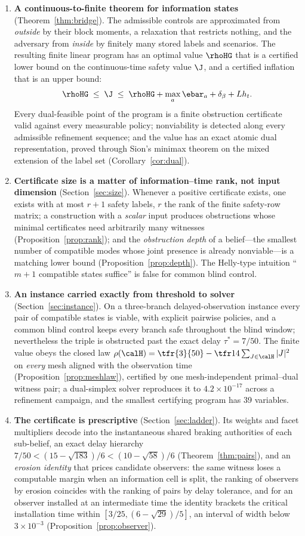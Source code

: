 \begin{enumerate}[leftmargin=1.6em,itemsep=2pt]
\item \textbf{A continuous-to-finite theorem for information states} (Theorem~\ref{thm:bridge}). The admissible controls are approximated from \emph{outside} by their block moments, a relaxation that restricts nothing, and the adversary from \emph{inside} by finitely many stored labels and scenarios. The resulting finite linear program has an optimal value $\rhoHG$ that is a certified lower bound on the continuous-time safety value $\J$, and a certified inflation that is an upper bound:
\[
\rhoHG\;\le\;\J\;\le\;\rhoHG+\max_a\ebar_a+\delta_\beta+Lh_t .
\]
Every dual-feasible point of the program is a finite obstruction certificate valid against every measurable policy; nonviability is detected along every admissible refinement sequence; and the value has an exact atomic dual representation, proved through Sion's minimax theorem on the mixed extension of the label set (Corollary~\ref{cor:dual}).
\item \textbf{Certificate size is a matter of information--time rank, not input dimension} (Section~\ref{sec:size}). Whenever a positive certificate exists, one exists with at most $r+1$ safety labels, $r$ the rank of the finite safety-row matrix; a construction with a \emph{scalar} input produces obstructions whose minimal certificates need arbitrarily many witnesses (Proposition~\ref{prop:rank}); and the \emph{obstruction depth} of a belief---the smallest number of compatible modes whose joint presence is already nonviable---is a matching lower bound (Proposition~\ref{prop:depth}). The Helly-type intuition ``$m+1$ compatible states suffice'' is false for common blind control.
\item \textbf{An instance carried exactly from threshold to solver} (Section~\ref{sec:instance}). On a three-branch delayed-observation instance every pair of compatible states is viable, with explicit pairwise policies, and a common blind control keeps every branch safe throughout the blind window; nevertheless the triple is obstructed past the exact delay $\tau^\ast=7/50$. The finite value obeys the closed law $\rho(\calH)=\tfr{3}{50}-\tfr14\sum_{J\in\calH}|J|^2$ on \emph{every} mesh aligned with the observation time (Proposition~\ref{prop:meshlaw}), certified by one mesh-independent primal--dual witness pair; a dual-simplex solver reproduces it to $4.2\times10^{-17}$ across a refinement campaign, and the smallest certifying program has 39 variables.
\item \textbf{The certificate is prescriptive} (Section~\ref{sec:ladder}). Its weights and facet multipliers decode into the instantaneous shared braking authorities of each sub-belief, an exact delay hierarchy $7/50<(15-\sqrt{183})/6<(10-\sqrt{58})/6$ (Theorem~\ref{thm:pairs}), and an \emph{erosion identity} that prices candidate observers: the same witness loses a computable margin when an information cell is split, the ranking of observers by erosion coincides with the ranking of pairs by delay tolerance, and for an observer installed at an intermediate time the identity brackets the critical installation time within $[3/25,(6-\sqrt{29})/5]$, an interval of width below $3\times10^{-3}$ (Proposition~\ref{prop:observer}).

\end{enumerate}
